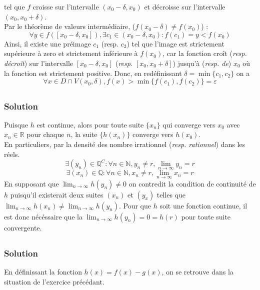 			tel que $f$ croisse sur l'intervalle $(x_0-\delta,x_0)$ et décroisse sur l'intervalle $(x_0,x_0+\delta)$.\\
			Par le théorème de valeurs intermédiaire, ($f(x_0-\delta)\neq f(x_0)$) :
			\[
				\forall y\in f([x_0-\delta,x_0]),\exists c_1\in (x_0-\delta,x_0) : f(c_1)=y<f(x_0)
			\]
			Ainsi, il existe une préimage $c_1$ (resp. $c_2$) tel que l'image est strictement supérieure à zero et strictement inférieure à $f(x_0)$, car la fonction croît (\textit{resp. décroît}) sur l'intervalle $[x_0-\delta,x_0]$ (\textit{resp.} $[x_0,x_0+\delta]$) jusqu'à (\textit{resp. de}) $x_0$ où la fonction est strictement positive.
			Donc, en redéfinissant $\delta=\min\{c_1,c_2\}$ on a \[\forall x\in D\cap V(x_0,\delta), f(x)>\min\{f(c_1),f(c_2)\}=\varepsilon\]
		\subsection{}
		\subsubsection*{Solution}
			Puisque $h$ est continue, alors pour toute suite $\{x_n\}$ qui converge vers $x_0$ avec $x_n\in\mathbb{R}$ pour chaque $n$, la suite $\{h(x_n)\}$ converge vers $h(x_0)$.\\
			En particuliers, par la densité des nombre irrationnel (\textit{resp. rationnel}) dans les réels.
			\[
				\exists(y_n)\in\mathbb{Q}^C : \forall n\in\mathbb{N}, y_n\neq r, \lim_{n\to\infty} y_n = r
			\]
			\[
			\exists(x_n)\in\mathbb{Q} : \forall n\in\mathbb{N}, x_n\neq r, \lim_{n\to\infty} x_n = r
			\]
			En supposant que $\lim_{n\to\infty} h(y_n)\neq 0$ on contredit la condition de continuité de $h$ puisqu'il existerait deux suites $(x_n)$ et $(y_x)$ telles que $\lim_{n\to\infty} h(x_n)\neq \lim_{n\to\infty} h(y_n)$. Pour que $h$ soit une fonction continue, il est donc nécéssaire que la $\lim_{n\to\infty} h(y_n)= 0=h(r)$ pour toute suite convergente.
		\subsection{}
		\subsubsection*{Solution}
		En définissant la fonction $h(x)=f(x)-g(x)$, on se retrouve dans la situation de l'exercice précédant.
